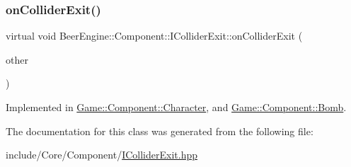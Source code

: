 \subsubsection{\texorpdfstring{on\+Collider\+Exit()}{onColliderExit()}}
{\footnotesize\ttfamily virtual void Beer\+Engine\+::\+Component\+::\+I\+Collider\+Exit\+::on\+Collider\+Exit (\begin{DoxyParamCaption}\item[{\mbox{\hyperlink{class_beer_engine_1_1_component_1_1_a_collider}{A\+Collider}} $\ast$}]{other }\end{DoxyParamCaption})\hspace{0.3cm}{\ttfamily [pure virtual]}}



Implemented in \mbox{\hyperlink{class_game_1_1_component_1_1_character_afe4232175cd33c92027adacba5217b16}{Game\+::\+Component\+::\+Character}}, and \mbox{\hyperlink{class_game_1_1_component_1_1_bomb_a73e1089e8b6be42c0357beda3ab6ccfa}{Game\+::\+Component\+::\+Bomb}}.



The documentation for this class was generated from the following file\+:\begin{DoxyCompactItemize}
\item 
include/\+Core/\+Component/\mbox{\hyperlink{_i_collider_exit_8hpp}{I\+Collider\+Exit.\+hpp}}\end{DoxyCompactItemize}
